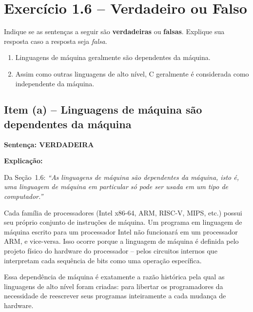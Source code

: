 \documentclass[12pt,a4paper]{article}
\begin{document}
\section{Exercício 1.6 -- Verdadeiro ou Falso}

\begin{enunciadoBox}[Enunciado]
Indique se as sentenças a seguir são \textbf{verdadeiras} ou \textbf{falsas}.
Explique sua resposta caso a resposta seja \textit{falsa}.
\begin{enumerate}
  \item Linguagens de máquina geralmente são dependentes da máquina.
  \item Assim como outras linguagens de alto nível, C geralmente é considerada como independente da máquina.
\end{enumerate}
\end{enunciadoBox}

\bigskip

\subsection*{Item (a) -- Linguagens de máquina são dependentes da máquina}

\begin{verdadeiroBox}
\textbf{Sentença: VERDADEIRA}

\medskip
\textbf{Explicação:}

Da Seção~1.6: \textit{``As linguagens de máquina são dependentes da máquina, isto é,
uma linguagem de máquina em particular só pode ser usada em um tipo de computador.''}

Cada família de processadores (Intel x86-64, ARM, RISC-V, MIPS, etc.) possui seu
próprio conjunto de instruções de máquina. Um programa em linguagem de máquina escrito
para um processador Intel não funcionará em um processador ARM, e vice-versa. Isso ocorre
porque a linguagem de máquina é definida pelo projeto físico do hardware do processador
-- pelos circuitos internos que interpretam cada sequência de bits como uma operação
específica.

\medskip
Essa dependência de máquina é exatamente a razão histórica pela qual as linguagens de
alto nível foram criadas: para libertar os programadores da necessidade de reescrever
seus programas inteiramente a cada mudança de hardware.
\end{verdadeiroBox}

\bigskip
\end{document}
